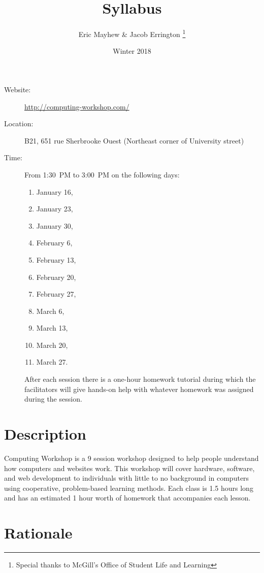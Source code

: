 \documentclass[11pt]{article}
\author{%
  Eric Mayhew \& Jacob Errington%
  \footnote{Special thanks to McGill's Office of Student Life and Learning}
}
\title{Syllabus}
\date{Winter 2018}
\begin{document}
\maketitle

\begin{description}
  \item[Website:]
    \url{http://computing-workshop.com/}

  \item[Location:]
    B21, 651 rue Sherbrooke Ouest
    (Northeast corner of University street)

  \item[Time:]
    From 1:30~PM to 3:00~PM on the following days:
    \begin{enumerate}
      \item January 16,
      \item January 23,
      \item January 30,
      \item February 6,
      \item February 13,
      \item February 20,
      \item February 27,
      \item March 6,
      \item March 13,
      \item March 20,
      \item March 27.
    \end{enumerate}

    After each session there is a one-hour homework tutorial during which the
    facilitators will give hands-on help with whatever homework was assigned
    during the session.
\end{description}

\section*{Description}

Computing Workshop is a 9 session workshop designed to help people understand
how computers and websites work. This workshop will cover hardware, software,
and web development to individuals with little to no background in computers
using cooperative, problem-based learning methods. Each class is 1.5 hours long
and has an estimated 1 hour worth of homework that accompanies each lesson.

\section*{Rationale}
\end{document}
